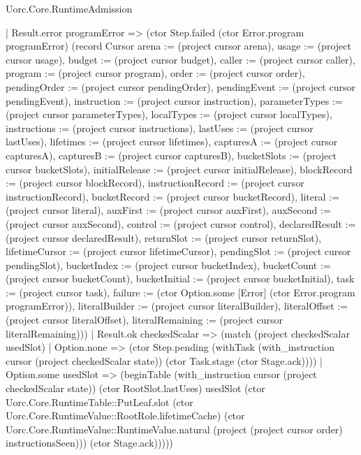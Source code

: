 \begin{lexlean}{Uorc.Core.RuntimeAdmission}
\begin{semanticmodule}
{              | Result.error programError => (ctor Step.failed (ctor Error.program programError) (record Cursor {arena := (project cursor arena), usage := (project cursor usage), budget := (project cursor budget), caller := (project cursor caller), program := (project cursor program), order := (project cursor order), pendingOrder := (project cursor pendingOrder), pendingEvent := (project cursor pendingEvent), instruction := (project cursor instruction), parameterTypes := (project cursor parameterTypes), localTypes := (project cursor localTypes), instructions := (project cursor instructions), lastUses := (project cursor lastUses), lifetimes := (project cursor lifetimes), capturesA := (project cursor capturesA), capturesB := (project cursor capturesB), bucketSlots := (project cursor bucketSlots), initialRelease := (project cursor initialRelease), blockRecord := (project cursor blockRecord), instructionRecord := (project cursor instructionRecord), bucketRecord := (project cursor bucketRecord), literal := (project cursor literal), auxFirst := (project cursor auxFirst), auxSecond := (project cursor auxSecond), control := (project cursor control), declaredResult := (project cursor declaredResult), returnSlot := (project cursor returnSlot), lifetimeCursor := (project cursor lifetimeCursor), pendingSlot := (project cursor pendingSlot), bucketIndex := (project cursor bucketIndex), bucketCount := (project cursor bucketCount), bucketInitial := (project cursor bucketInitial), task := (project cursor task), failure := (ctor Option.some [Error] (ctor Error.program programError)), literalBuilder := (project cursor literalBuilder), literalOffset := (project cursor literalOffset), literalRemaining := (project cursor literalRemaining)}))
              | Result.ok checkedScalar => (match (project checkedScalar usedSlot)
                | Option.none => (ctor Step.pending (withTask (with_instruction cursor (project checkedScalar state)) (ctor Task.stage (ctor Stage.ack))))
                | Option.some usedSlot => (beginTable (with_instruction cursor (project checkedScalar state)) (ctor RootSlot.lastUses) usedSlot (ctor Uorc.Core.RuntimeTable::PutLeaf.slot (ctor Uorc.Core.RuntimeValue::RootRole.lifetimeCache) (ctor Uorc.Core.RuntimeValue::RuntimeValue.natural (project (project cursor order) instructionsSeen))) (ctor Stage.ack)))))
}
\end{semanticmodule}
\end{lexlean}
